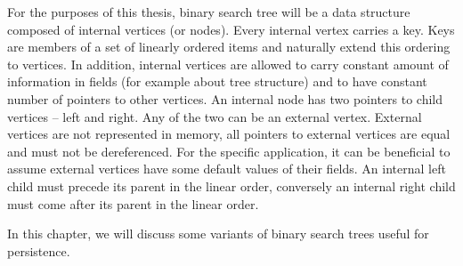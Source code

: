 For the purposes of this thesis, binary search tree will be a data structure composed of internal vertices (or nodes). Every internal vertex carries a key. Keys are members of a set of linearly ordered items and naturally extend this ordering to vertices. In addition, internal vertices are allowed to carry constant amount of information in fields (for example about tree structure) and to have constant number of pointers to other vertices. An internal node has two pointers to child vertices -- left and right. Any of the two can be an external vertex. External vertices are not represented in memory, all pointers to external vertices are equal and must not be dereferenced. For the specific application, it can be beneficial to assume external vertices have some default values of their fields. An internal left child must precede its parent in the linear order, conversely an internal right child must come after its parent in the linear order.

In this chapter, we will discuss some variants of binary search trees useful for persistence.
